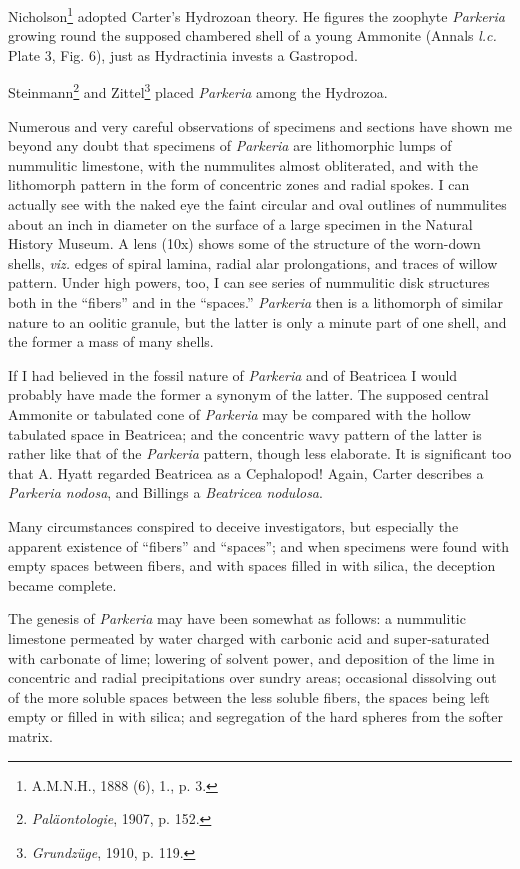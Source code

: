\documentclass[a4paper, 12pt, oneside]{article}
\begin{document}
Nicholson\footnote{A.M.N.H., 1888 (6), 1., p. 3.} adopted Carter's Hydrozoan theory. He figures the zoophyte \emph{Parkeria} growing round the supposed chambered shell of a young Ammonite (Annals \emph{l.c.} Plate 3, Fig. 6), just as Hydractinia invests a Gastropod.

Steinmann\footnote{\emph{Paläontologie}, 1907, p. 152.} and Zittel\footnote{\emph{Grundzüge}, 1910, p. 119.} placed \emph{Parkeria} among the Hydrozoa.

Numerous and very careful observations of specimens and sections have shown me beyond any doubt that specimens of \emph{Parkeria} are lithomorphic lumps of nummulitic limestone, with the nummulites almost obliterated, and with the lithomorph pattern in the form of concentric zones and radial spokes. I can actually see with the naked eye the faint circular and oval outlines of nummulites about an inch in diameter on the surface of a large specimen in the Natural History Museum. A lens (10x) shows some of the structure of the worn-down shells, \emph{viz.} edges of spiral lamina, radial alar prolongations, and traces of willow pattern. Under high powers, too, I can see series of nummulitic disk structures both in the ``fibers'' and in the ``spaces.'' \emph{Parkeria} then is a lithomorph of similar nature to an oolitic granule, but the latter is only a minute part of one shell, and the former a mass of many shells.

If I had believed in the fossil nature of \emph{Parkeria} and of Beatricea I would probably have made the former a synonym of the latter. The supposed central Ammonite or tabulated cone of \emph{Parkeria} may be compared with the hollow tabulated space in Beatricea; and the concentric wavy pattern of the latter is rather like that of the \emph{Parkeria} pattern, though less elaborate. It is significant too that A. Hyatt regarded Beatricea as a Cephalopod! Again, Carter describes a \emph{Parkeria nodosa}, and Billings a \emph{Beatricea nodulosa}.

Many circumstances conspired to deceive investigators, but especially the apparent existence of ``fibers'' and ``spaces''; and when specimens were found with empty spaces between fibers, and with spaces filled in with silica, the deception became complete.

The genesis of \emph{Parkeria} may have been somewhat as follows: a nummulitic limestone permeated by water charged with carbonic acid and super-saturated with carbonate of lime; lowering of solvent power, and deposition of the lime in concentric and radial precipitations over sundry areas; occasional dissolving out of the more soluble spaces between the less soluble fibers, the spaces being left empty or filled in with silica; and segregation of the hard spheres from the softer matrix.
\end{document}
